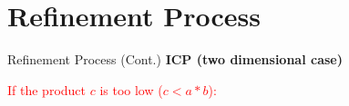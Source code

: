 \documentclass[]{beamer}
\begin{document}
\section{Refinement Process}
\begin{frame}{Refinement Process (Cont.)}
    \textbf{ICP (two dimensional case)}\newline
    
    \textcolor{red}{If the product $c$ is too low ($c < a \ast b$):}
    \begin{overlayarea}{12cm}{5.5cm}
    	\centering
    	\begin{minipage}{5cm}
    		\vspace{1cm}
    		\begin{figure}	
    		\end{figure}
    		\centering
    		\vspace{-0.5cm}
    	\end{minipage}

\end{overlayarea}
\end{frame}
\end{document}
